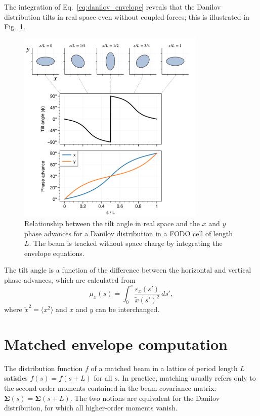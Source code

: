 The integration of Eq.~\eqref{eq:danilov_envelope} reveals that the Danilov distribution tilts in real space even without coupled forces; this is illustrated in Fig.~\ref{fig:fodo_zerosc}. 
%
\begin{figure}[!p]
    \centering
    \includegraphics[width=0.8\textwidth]{Images/chapter2/fodo_zerosc.png}
    \caption{Relationship between the tilt angle in real space and the $x$ and $y$ phase advances for a Danilov distribution in a FODO cell of length $L$. The beam is tracked without space charge by integrating the envelope equations.}
    \label{fig:fodo_zerosc}
\end{figure}
%
The tilt angle is a function of the difference between the horizontal and vertical phase advances, which are calculated from
\begin{equation} \label{eq:phase_advance}
    \mu_x(s) = \int_{0}^{s}
    {\frac{\varepsilon_x(s')}{{\tilde{x}(s')}^2} \, ds'},
\end{equation}
where $\tilde{x}^2 = \langle{x^2}\rangle$ and $x$ and $y$ can be interchanged.



\section{Matched envelope computation}

The distribution function $f$ of a matched beam in a lattice of period length $L$ satisfies $f(s) = f(s + L)$ for all $s$. In practice, matching usually refers only to the second-order moments contained in the beam covariance matrix: $\bm{\Sigma}(s) = \bm{\Sigma}(s + L)$. The two notions are equivalent for the Danilov distribution, for which all higher-order moments vanish.

